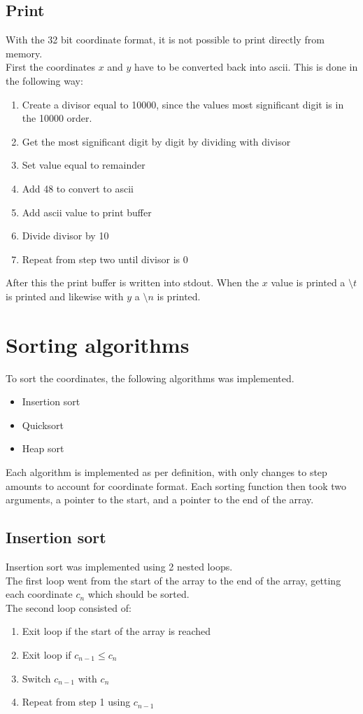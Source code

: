 \documentclass[12pt, a4paper]{article}
\begin{document}
		\subsection{Print}
			With the 32 bit coordinate format, it is not possible to print directly from memory.\\
			First the coordinates $x$ and $y$ have to be converted back into ascii. This is done in the following way:
			\begin{enumerate}
				\addtolength\itemsep{-2mm}
				\item Create a divisor equal to 10000, since the values most significant digit is in the 10000 order.
				\item Get the most significant digit by digit by dividing with divisor
				\item Set value equal to remainder
				\item Add 48 to convert to ascii
				\item Add ascii value to print buffer
				\item Divide divisor by 10
				\item Repeat from step two until divisor is 0
			\end{enumerate}
			After this the print buffer is written into stdout. When the $x$ value is printed a $\setminus t$ is printed and likewise with $y$ a $\setminus n$ is printed.
	\section{Sorting algorithms}
		To sort the coordinates, the following algorithms was implemented.
		\begin{itemize}
				\addtolength\itemsep{-2mm}
			\item Insertion sort
			\item Quicksort
			\item Heap sort
		\end{itemize}
		Each algorithm is implemented as per definition, with only changes to step amounts to account for coordinate format. Each sorting function then took two arguments, a pointer to the start, and a pointer to the end of the array.
		\subsection{Insertion sort}
			Insertion sort was implemented using 2 nested loops.\\
			The first loop went from the start of the array to the end of the array, getting each coordinate $c_n$ which should be sorted.\\
			The second loop consisted of:
			\begin{enumerate}
				\addtolength\itemsep{-2mm}
				\item Exit loop if the start of the array is reached
				\item Exit loop if $c_{n-1} \leq c_n$ 
				\item Switch $c_{n-1}$ with $c_n$ 
				\item Repeat from step 1 using $c_{n-1}$
			\end{enumerate}
\end{document}
